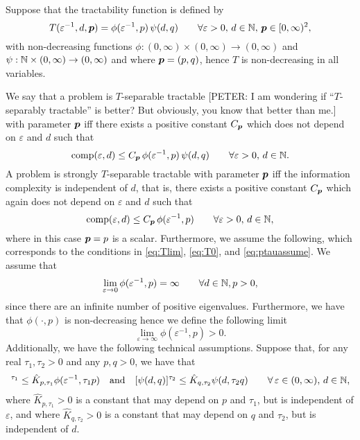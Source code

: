 \documentclass[sort&compress]{elsarticle}
\newcommand{\peter}[1]{\begingroup\color{violet}#1\endgroup}
\begin{document}
\begin{example}
Suppose that the tractability function is defined by
\[
 T(\varepsilon^{-1},d,\boldsymbol{p})= \phi(\varepsilon^{-1},p)\, \psi(d,q)
 \qquad \forall \varepsilon > 0, \,  d \in \mathbb{N}, \, \boldsymbol{p} \in [0,\infty)^2,
\]
with non-decreasing functions $\phi : (0,\infty) \times (0,\infty) \to (0,\infty)$ and $\psi : \mathbb{N}  \times (0,\infty) \to (0,\infty)$ and where $\boldsymbol{p} = (p,q)$, hence $T$ is non-decreasing in all variables.

We say that a problem is $T$-separable tractable \peter{[PETER: I am wondering if ``$T$-separably tractable'' is better? But obviously, you know that better than me.]} with parameter $\boldsymbol{p}$ iff there exists a positive constant $C_{\boldsymbol{p}}$ which does not depend on $\varepsilon$ and $d$ such that
\[
\operatorname{comp}(\varepsilon,d) \leq  C_{\boldsymbol{p}} \,  \phi(\varepsilon^{-1},p)\, \psi(d,q)\qquad \forall \varepsilon >0, \, d\in\mathbb{N}.
\]
A problem is strongly $T$-separable tractable with parameter $\boldsymbol{p}$ iff the information complexity is independent of $d$, that is, there exists a positive constant $C_{\boldsymbol{p}}$ which again does not depend on $\varepsilon$ and $d$ such that
\[
\operatorname{comp}(\varepsilon,d) \leq C_{\boldsymbol{p}}\,\phi(\varepsilon^{-1},p)\qquad \forall \varepsilon >0, \, d\in\mathbb{N},
\] where in this case $\boldsymbol{p} = p$ is a scalar.
Furthermore, we assume the following, which corresponds to the conditions in \eqref{eq:Tlim}, \eqref{eq:T0}, and \eqref{eq:ptauassume}. We assume that
\[
\lim_{\varepsilon\rightarrow0}\phi(\varepsilon^{-1},p) = \infty \qquad \forall d\in\mathbb{N}, p >0,
\]
since there are an infinite number of positive eigenvalues. Furthermore, we have that $\phi(\cdot,p)$ is non-decreasing hence we define the following limit
\[
\lim_{\varepsilon \rightarrow \infty}\phi(\varepsilon^{-1},p) >0.
\]
Additionally, we have the following technical assumptions. Suppose that, for any real $\tau_1, \tau_2>0$ and any $p,q>0$, we have that
\begin{align*}
     [\phi(\varepsilon^{-1},p)]^{\tau_1} \le \hat{K}_{p,\tau_1} \phi (\varepsilon^{-1},\tau_1 p)
     \quad \mbox{and} \quad
      [\psi(d,q)]^{\tau_2} \le \hat{K}_{q,\tau_2} \psi (d,\tau_2 q) \qquad \forall \, \varepsilon \in (0,\infty),\, d\in \naturals,
\end{align*} where $\hat{K}_{p,\tau_1}>0$ is a constant that may depend on $p$ and $\tau_1$, but is independent of $\varepsilon$, and where $\hat{K}_{q,\tau_2}>0$ is a constant that may depend on $q$ and $\tau_2$, but is independent of $d$.


\end{example}
\end{document}
